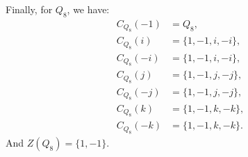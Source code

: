 \begin{solution}
  Finally, for $Q_8$, we have:
  \begin{align*}
    C_{Q_8}(-1) &= Q_8, \\
    C_{Q_8}(i) &= \{1, -1, i, -i\}, \\
    C_{Q_8}(-i) &= \{1, -1, i, -i\}, \\
    C_{Q_8}(j) &= \{1, -1, j, -j\}, \\
    C_{Q_8}(-j) &= \{1, -1, j, -j\}, \\
    C_{Q_8}(k) &= \{1, -1, k, -k\}, \\
    C_{Q_8}(-k) &= \{1, -1, k, -k\}.
  \end{align*}
  And $Z(Q_8) = \{1, -1\}$.
\end{solution}
